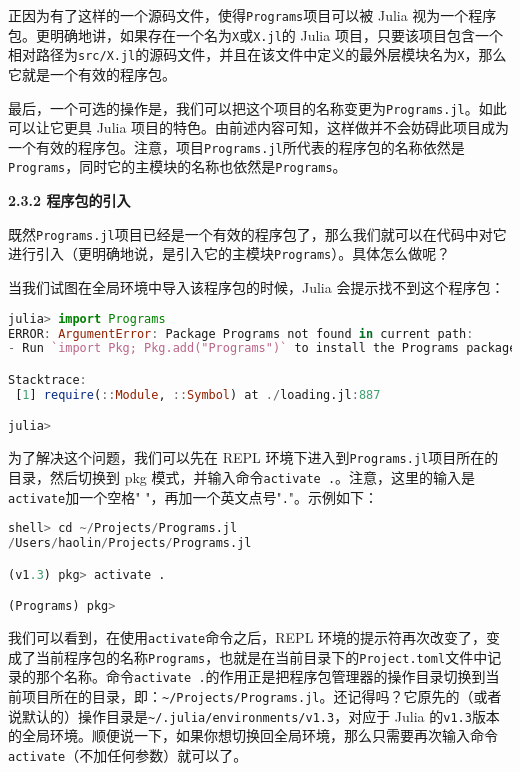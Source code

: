 正因为有了这样的一个源码文件，使得\verb|Programs|项目可以被 Julia 视为一个程序包。更明确地讲，如果存在一个名为\verb|X|或\verb|X.jl|的 Julia 项目，只要该项目包含一个相对路径为\verb|src/X.jl|的源码文件，并且在该文件中定义的最外层模块名为\verb|X|，那么它就是一个有效的程序包。

最后，一个可选的操作是，我们可以把这个项目的名称变更为\verb|Programs.jl|。如此可以让它更具 Julia 项目的特色。由前述内容可知，这样做并不会妨碍此项目成为一个有效的程序包。注意，项目\verb|Programs.jl|所代表的程序包的名称依然是\verb|Programs|，同时它的主模块的名称也依然是\verb|Programs|。

\textbf{2.3.2 程序包的引入}

既然\verb|Programs.jl|项目已经是一个有效的程序包了，那么我们就可以在代码中对它进行引入（更明确地说，是引入它的主模块\verb|Programs|）。具体怎么做呢？

当我们试图在全局环境中导入该程序包的时候，Julia 会提示找不到这个程序包：

\begin{lstlisting}[language=julia]
julia> import Programs
ERROR: ArgumentError: Package Programs not found in current path:
- Run `import Pkg; Pkg.add("Programs")` to install the Programs package.

Stacktrace:
 [1] require(::Module, ::Symbol) at ./loading.jl:887

julia> 
\end{lstlisting}

为了解决这个问题，我们可以先在 REPL 环境下进入到\verb|Programs.jl|项目所在的目录，然后切换到 pkg 模式，并输入命令\verb|activate .|。注意，这里的输入是\verb|activate|加一个空格" "，再加一个英文点号"\verb|.|"。示例如下：

\begin{lstlisting}[language=julia]
shell> cd ~/Projects/Programs.jl
/Users/haolin/Projects/Programs.jl

(v1.3) pkg> activate .

(Programs) pkg> 
\end{lstlisting}

我们可以看到，在使用\verb|activate|命令之后，REPL 环境的提示符再次改变了，变成了当前程序包的名称\verb|Programs|，也就是在当前目录下的\verb|Project.toml|文件中记录的那个名称。命令\verb|activate .|的作用正是把程序包管理器的操作目录切换到当前项目所在的目录，即：\verb|~/Projects/Programs.jl|。还记得吗？它原先的（或者说默认的）操作目录是\verb|~/.julia/environments/v1.3|，对应于 Julia 的\verb|v1.3|版本的全局环境。顺便说一下，如果你想切换回全局环境，那么只需要再次输入命令\verb|activate|（不加任何参数）就可以了。

